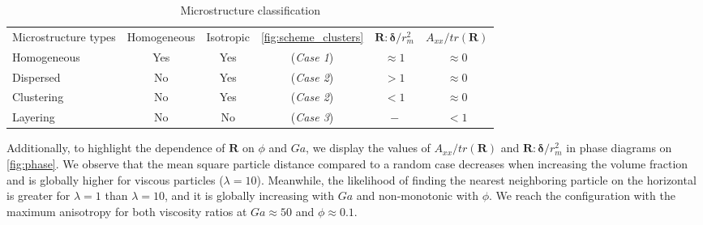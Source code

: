 \begin{table}[h!]
    \caption{Microstructure classification}
    \label{tab:microstructure}
    \centering
    \begin{tabular}{|lccccc|} \hline
        Microstructure types & Homogeneous & Isotropic & \ref{fig:scheme_clusters} & $\textbf{R}:\bm\delta/r_m^2$ & $A_{xx}/tr(\textbf{R})$ \\
        Homogeneous & Yes & Yes &(\textit{Case 1}) & $ \approx 1$ & $\approx 0$ \\
        Dispersed &  No & Yes  &(\textit{Case 2}) & $ > 1$ & $\approx 0$ \\
        Clustering &  No & Yes  &(\textit{Case 2}) & $ < 1$ & $\approx 0$ \\
        Layering &    No & No  &(\textit{Case 3}) & $ - $ & $< 1$\\ \hline
    \end{tabular}
\end{table}
Additionally, to highlight the dependence of $\textbf{R}$ on $\phi$ and $Ga$, we display the values of $A_{xx}/tr(\textbf{R})$ and $\textbf{R}:\bm\delta/r_m^2$ in phase diagrams on \ref{fig:phase}.
We observe that the mean square particle distance compared to a random case decreases when increasing the volume fraction and is globally higher for viscous particles ($\lambda = 10$).
Meanwhile, the likelihood of finding the nearest neighboring particle on the horizontal is greater for $\lambda=1$ than $\lambda = 10$, and it is globally increasing with  $Ga$ and non-monotonic with $\phi$. 
We reach the configuration with the maximum anisotropy for both viscosity ratios at $Ga \approx 50$ and $\phi \approx 0.1$. 

